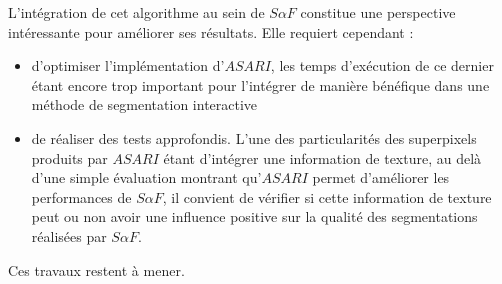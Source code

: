 L'intégration de cet algorithme au sein de $S \alpha F$  constitue une perspective intéressante pour améliorer ses résultats. Elle requiert cependant :
\begin{itemize}
\item d'optimiser l'implémentation d'$ASARI$, les temps d'exécution de ce dernier étant encore trop important pour l'intégrer de manière bénéfique dans une méthode de segmentation interactive \modif{;} 
\item de réaliser des tests approfondis. L'une des particularités des superpixels produits par $ASARI$ étant d'intégrer une information de texture, au delà d'une simple évaluation montrant qu'$ASARI$ permet d'améliorer les performances de $S \alpha F$, il convient de vérifier si cette information de texture peut ou non avoir une influence positive sur la qualité des segmentations réalisées par $S \alpha F$.
\end{itemize}

Ces travaux restent à mener.


\subsubsection*{} 

